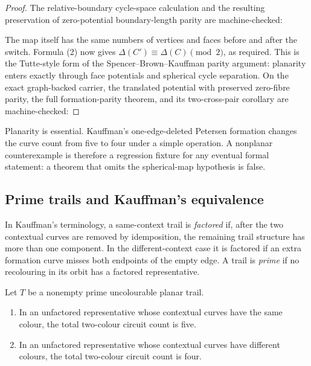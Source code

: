 \begin{proof}
The relative-boundary cycle-space calculation and the resulting preservation
of zero-potential boundary-length parity are machine-checked:

The map itself has the same numbers of vertices and faces before and after
the switch.  Formula (2) now gives
$\Delta(C')\equiv\Delta(C)\pmod2$, as required.  This is the
Tutte-style form of the Spencer--Brown--Kauffman parity argument: planarity
enters exactly through face potentials and spherical cycle separation.
On the exact graph-backed carrier, the translated potential with preserved
zero-fibre parity, the full formation-parity theorem, and its two-cross-pair
corollary are machine-checked:
\end{proof}

Planarity is essential.  Kauffman's one-edge-deleted Petersen formation
changes the curve count from five to four under a simple operation.  A
nonplanar counterexample is therefore a regression fixture for any eventual
formal statement: a theorem that omits the spherical-map hypothesis is
false.

\subsection{Prime trails and Kauffman's equivalence}

In Kauffman's terminology, a same-context trail is \emph{factored} if,
after the two contextual curves are removed by idemposition, the remaining
trail structure has more than one component.  In the different-context
case it is factored if an extra formation curve misses both endpoints of the
empty edge.  A trail is \emph{prime} if no recolouring in its orbit has a
factored representative.

\begin{lemma}
\label{lem:kauffman-curve-count}
\Ssource
Let $T$ be a nonempty prime uncolourable planar trail.
\begin{enumerate}
  \item In an unfactored representative whose contextual curves have the
        same colour, the total two-colour circuit count is five.
  \item In an unfactored representative whose contextual curves have
        different colours, the total two-colour circuit count is four.
\end{enumerate}
\end{lemma}

